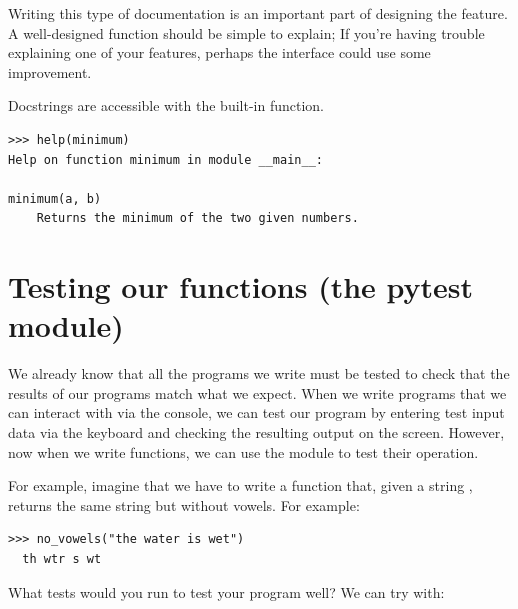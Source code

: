Writing this type of documentation is an important part of designing the feature. A well-designed function should be simple to explain; If you're having trouble explaining one of your features, perhaps the interface could use some improvement.

Docstrings are accessible with the built-in  function.

\begin{Verbatim}[frame=single]
>>> help(minimum)
Help on function minimum in module __main__:

minimum(a, b)
    Returns the minimum of the two given numbers.
\end{Verbatim}






\section{Testing our functions (the pytest module)}


We already know that all the programs we write must be tested to check that the results of our programs match what we expect.
%
When we write programs that we can interact with via the console, we can test our program by entering test input data via the keyboard and checking the resulting output on the screen.
%
However, now when we write functions, we can use the  module to test their operation.

For example, imagine that we have to write a function  that, given a string , returns the same string  but without vowels. For example:

\begin{Verbatim}[frame=single, label = {\em example of execution}]
>>> no_vowels("the water is wet")
  th wtr s wt
\end{Verbatim}

What tests would you run to test your program well? We can try with:

